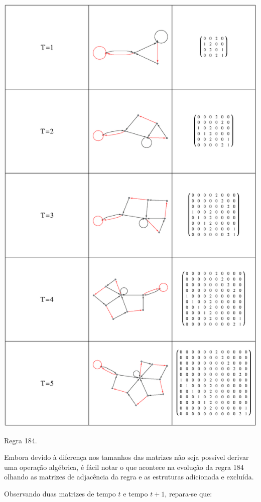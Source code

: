\documentclass[12pt,a4paper]{article}
\begin{document}
\begin{table}[H]
\begin{center}
\includegraphics[scale=0.6]{img/mat/matr184.eps}
\caption{Regra 184.}
\label{tab:mr184}
\end{center}
\end{table}

Embora devido à diferença nos tamanhos das matrizes não seja possível
derivar uma operação algébrica, é fácil notar o que acontece na evolução
da regra 184 olhando as matrizes de adjacência da regra e as estruturas
adicionada e excluída.

Observando duas matrizes de tempo $t$ e tempo $t+1$, repara-se que:
\end{document}
